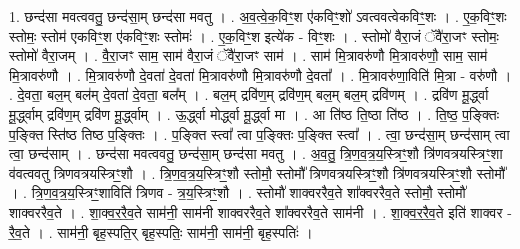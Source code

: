 \documentclass[17pt]{extarticle}
\begin{document}
1. छन्द॑सा मवत्ववतु॒ छन्द॑सा॒म् छन्द॑सा मवतु । . अ॒व॒त्वे॒क॒विꣳ॒॒श ए॑कविꣳ॒॒शो॑ ऽवत्ववत्वेकविꣳ॒॒शः । . ए॒क॒विꣳ॒॒शः स्तोमः॒ स्तोम॑ एकविꣳ॒॒श ए॑कविꣳ॒॒शः स्तोमः॑ । . ए॒क॒विꣳ॒॒श इत्ये॑क - विꣳ॒॒शः । . स्तोमो॑ वैरा॒जं ॅवै॑रा॒जꣳ स्तोमः॒ स्तोमो॑ वैरा॒जम् । . वै॒रा॒जꣳ साम॒ साम॑ वैरा॒जं ॅवै॑रा॒जꣳ साम॑ । . साम॑ मि॒त्रावरु॑णौ मि॒त्रावरु॑णौ॒ साम॒ साम॑ मि॒त्रावरु॑णौ । . मि॒त्रावरु॑णौ दे॒वता॑ दे॒वता॑ मि॒त्रावरु॑णौ मि॒त्रावरु॑णौ दे॒वता᳚ । . मि॒त्रावरु॑णा॒विति॑ मि॒त्रा - वरु॑णौ । . दे॒वता॒ बल॒म् बल॑म् दे॒वता॑ दे॒वता॒ बल᳚म् । . बल॒म् द्रवि॑ण॒म् द्रवि॑ण॒म् बल॒म् बल॒म् द्रवि॑णम् । . द्रवि॑ण मू॒र्द्ध्वा मू॒र्द्ध्वाम् द्रवि॑ण॒म् द्रवि॑ण मू॒र्द्ध्वाम् । . ऊ॒र्द्ध्वा मोर्द्ध्वा मू॒र्द्ध्वा मा । . आ ति॑ष्ठ ति॒ष्ठा ति॑ष्ठ । . ति॒ष्ठ॒ प॒ङ्क्तिः प॒ङ्क्ति स्ति॑ष्ठ तिष्ठ प॒ङ्क्तिः । . प॒ङ्क्ति स्त्वा᳚ त्वा प॒ङ्क्तिः प॒ङ्क्ति स्त्वा᳚ । . त्वा॒ छन्द॑सा॒म् छन्द॑साम् त्वा त्वा॒ छन्द॑साम् । . छन्द॑सा मवत्ववतु॒ छन्द॑सा॒म् छन्द॑सा मवतु । . अ॒व॒तु॒ त्रि॒ण॒व॒त्र॒य॒स्त्रिꣳ॒॒शौ त्रि॑णवत्रयस्त्रिꣳ॒॒शा व॑वत्ववतु त्रिणवत्रयस्त्रिꣳ॒॒शौ । . त्रि॒ण॒व॒त्र॒य॒स्त्रिꣳ॒॒शौ स्तोमौ॒ स्तोमौ᳚ त्रिणवत्रयस्त्रिꣳ॒॒शौ त्रि॑णवत्रयस्त्रिꣳ॒॒शौ स्तोमौ᳚ । . त्रि॒ण॒व॒त्र॒य॒स्त्रिꣳ॒॒शाविति॑ त्रिणव - त्र॒य॒स्त्रिꣳ॒॒शौ । . स्तोमौ॑ शाक्वररैव॒ते शा᳚क्वररैव॒ते स्तोमौ॒ स्तोमौ॑ शाक्वररैव॒ते । . शा॒क्व॒र॒रै॒व॒ते साम॑नी॒ साम॑नी शाक्वररैव॒ते शा᳚क्वररैव॒ते साम॑नी । . शा॒क्व॒र॒रै॒व॒ते इति॑ शाक्वर - रै॒व॒ते । . साम॑नी॒ बृह॒स्पति॒र् बृह॒स्पतिः॒ साम॑नी॒ साम॑नी॒ बृह॒स्पतिः॑ । \newline
\end{document}
